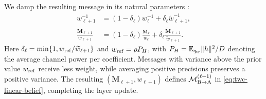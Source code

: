 We damp the resulting message in its natural parameters
\cite{vehtari2020}:
\begin{equation}
 \begin{aligned}
 w_{\ell+1}^{-1}&=(1-\delta_\ell)w_\ell^{-1}
                    +\delta_\ell\widetilde w_{\ell+1}^{-1},\\
 \frac{\mathbf M_{\ell+1}}{w_{\ell+1}}
 &=(1-\delta_\ell)\frac{\mathbf M_\ell}{w_\ell}
       +\delta_\ell\frac{\widetilde{\mathbf M}_{\ell+1}}
                           {\widetilde w_{\ell+1}}.
 \end{aligned}
 \label{eq:twc-damping}
\end{equation}
Here $\delta_\ell=\min\{1,w_{\rm ref}/\widetilde w_{\ell+1}\}$
and $w_{\rm ref}=\rho P_H$, with
$P_H=\mathbb{E}_{q_{\rm tr}}\|h\|^2/D$ denoting the average channel power
per coefficient.
Messages with variance above the prior value $w_{\rm ref}$ receive
less weight, while averaging positive precisions preserves a positive
variance. The resulting $(\mathbf M_{\ell+1},w_{\ell+1})$ defines
$\mathcal M_{\rm B\to A}^{(\ell+1)}$ in
\eqref{eq:twc-linear-belief}, completing the layer update.
